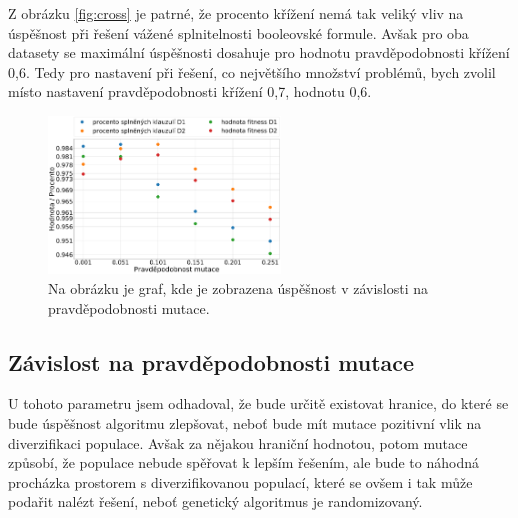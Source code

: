 \documentclass[11pt]{article}
\begin{document}
Z obrázku \ref{fig:cross} je patrné, že procento křížení nemá tak veliký vliv na úspěšnost při řešení vážené splnitelnosti booleovské formule. Avšak pro oba datasety se maximální úspěšnosti dosahuje pro hodnotu pravděpodobnosti křížení 0,6. Tedy pro nastavení při řešení, co největšího množství problémů, bych zvolil místo nastavení pravděpodobnosti křížení 0,7, hodnotu 0,6.

\begin{figure}
\begin{center}
\includegraphics[width=0.55\textwidth]{img/sat_mut.pdf} 
\caption{Na obrázku je graf, kde je zobrazena úspěšnost v závislosti na pravděpodobnosti mutace.}
\label{fig:mut}
\end{center}
\end{figure}

\subsection{Závislost na pravděpodobnosti mutace}
U tohoto parametru jsem odhadoval, že bude určitě existovat hranice, do které se bude úspěšnost algoritmu zlepšovat, neboť bude mít mutace pozitivní vlik na diverzifikaci populace. Avšak za nějakou hraniční hodnotou, potom mutace způsobí, že populace nebude spěřovat k lepším řešením, ale bude to náhodná procházka prostorem s diverzifikovanou populací, které se ovšem i tak může podařit nalézt řešení, neboť genetický algoritmus je randomizovaný.
\end{document}
